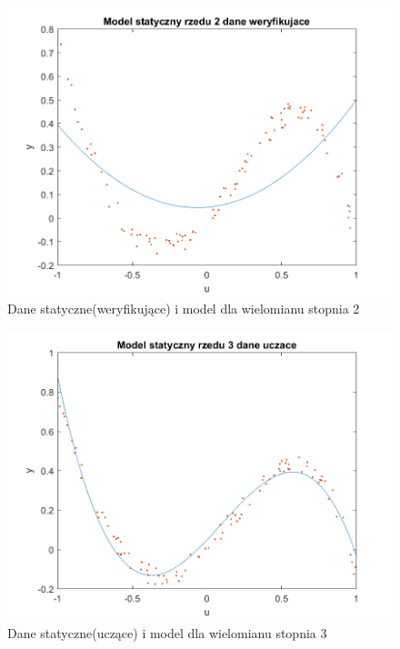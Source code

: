 \documentclass{article}
\begin{document}
\begin{figure}
\centering
\includegraphics[width=0.95\linewidth]{../dane_statyczne/dane_statyczne_model_rzedu_2_weryf}
\caption{Dane statyczne(weryfikujące) i model dla wielomianu stopnia 2}
\label{fig:danestatyczneweryf2}
\end{figure}

\begin{figure}
\centering
\includegraphics[width=0.95\linewidth]{../dane_statyczne/dane_statyczne_model_rzedu_3_uczace}
\caption{Dane statyczne(uczące) i model dla wielomianu stopnia 3}
\label{fig:danestatyczneuczace3}
\end{figure}
\end{document}
